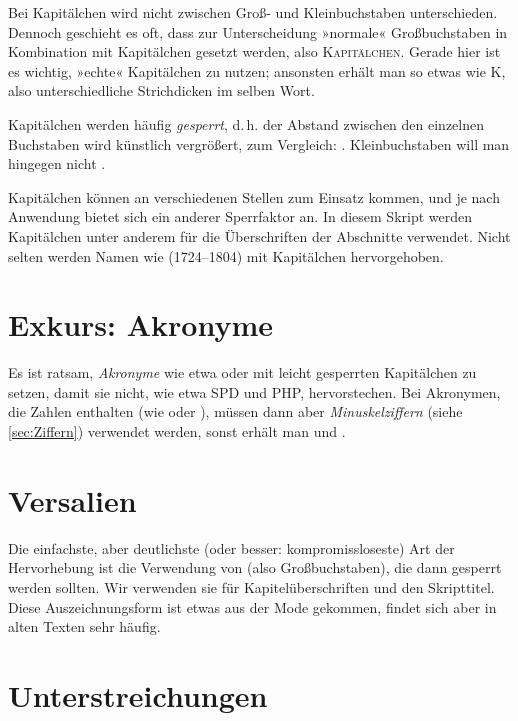 Bei Kapitälchen wird nicht zwischen Groß- und Kleinbuchstaben
unterschieden. Dennoch geschieht es oft, dass zur Unterscheidung »normale«
Großbuchstaben in Kombination mit Kapitälchen gesetzt werden, also
\textsc{Kapitälchen}. Gerade hier ist es wichtig, »echte« Kapitälchen zu
nutzen; ansonsten erhält man so etwas wie K, also
unterschiedliche Strichdicken im selben Wort.

Kapitälchen werden häufig
\emph{gesperrt}, d.\,h. der Abstand zwischen den einzelnen Buchstaben wird
künstlich vergrößert, zum Vergleich:
. Kleinbuchstaben will man hingegen nicht
.

Kapitälchen können an verschiedenen Stellen zum Einsatz kommen, und je nach
Anwendung bietet sich ein anderer Sperrfaktor an. In diesem Skript werden
Kapitälchen unter anderem für die Überschriften der Abschnitte verwendet. Nicht
selten werden Namen wie  (1724–1804) mit
Kapitälchen hervorgehoben.

\section{Exkurs: Akronyme}

Es ist ratsam, \emph{Akronyme} wie etwa  oder  mit leicht
gesperrten Kapitälchen zu setzen, damit sie nicht, wie etwa SPD und PHP,
hervorstechen. Bei Akronymen, die Zahlen enthalten (wie 
oder ), müssen dann aber \emph{Minuskelziffern} (siehe
\cref{sec:Ziffern}) verwendet werden, sonst erhält man
 und
.

\section{Versalien}

Die einfachste, aber deutlichste (oder besser: kompromissloseste) Art
der Hervorhebung ist die Verwendung von  (also
Großbuchstaben), die dann gesperrt werden sollten. Wir verwenden sie für
Kapitelüberschriften und den Skripttitel.  Diese Auszeichnungsform ist etwas aus
der Mode gekommen, findet sich aber in alten Texten sehr häufig.

\section{Unterstreichungen}

